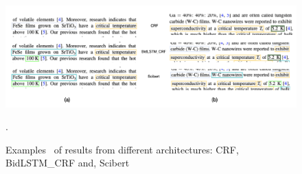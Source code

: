 \documentclass[]{interact}
\theoremstyle{plain}%
\theoremstyle{definition}
\theoremstyle{remark}
\begin{document}
\begin{figure}[ht]
    \centering
    \includegraphics[width=\textwidth]{example-comparison-archs.png}
    \caption{Examples~\cite{Gajda_2016, Shibata_2016} of results from different architectures: CRF, BidLSTM\_CRF and, Scibert}.
    \label{fig:example-comparison-architectures}
\end{figure}
\end{document}
